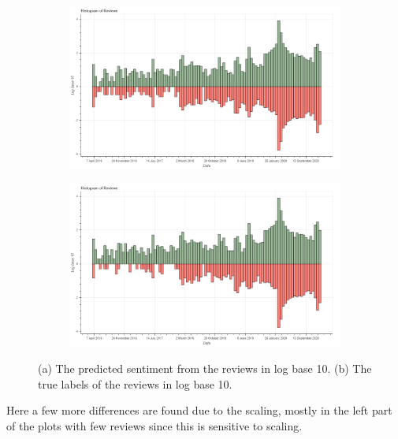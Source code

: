 \begin{figure}[H]
    \centering
    \begin{subfigure}[b]{0.9\textwidth}
        \includegraphics[width=1\textwidth]{../plots/validation_plot_log.png}
       \caption{}
       \label{fig:plot-comp1-log} 
    \end{subfigure}
    
    \begin{subfigure}[b]{0.9\textwidth}
        \includegraphics[width=1\textwidth]{../plots/true_plot_log.png}
       \caption{}
       \label{fig:plot-comp2-log}
    \end{subfigure}
    
    \caption[Plot of Scaled Reviews]{(a) The predicted sentiment from the reviews in log base 10. (b) The true labels of the reviews in log base 10.}
\end{figure}


Here a few more differences are found due to the scaling, mostly in the left part of the plots with few reviews since this is sensitive to scaling. 


